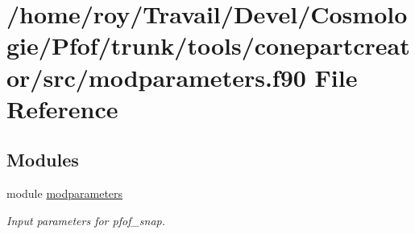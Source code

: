 \hypertarget{tools_2conepartcreator_2src_2modparameters_8f90}{}\section{/home/roy/\+Travail/\+Devel/\+Cosmologie/\+Pfof/trunk/tools/conepartcreator/src/modparameters.f90 File Reference}
\label{tools_2conepartcreator_2src_2modparameters_8f90}
\subsection*{Modules}
\begin{DoxyCompactItemize}
\item 
module \hyperlink{namespacemodparameters}{modparameters}
\begin{DoxyCompactList}\small\item\em Input parameters for pfof\+\_\+snap. ~\newline
 \end{DoxyCompactList}\end{DoxyCompactItemize}

